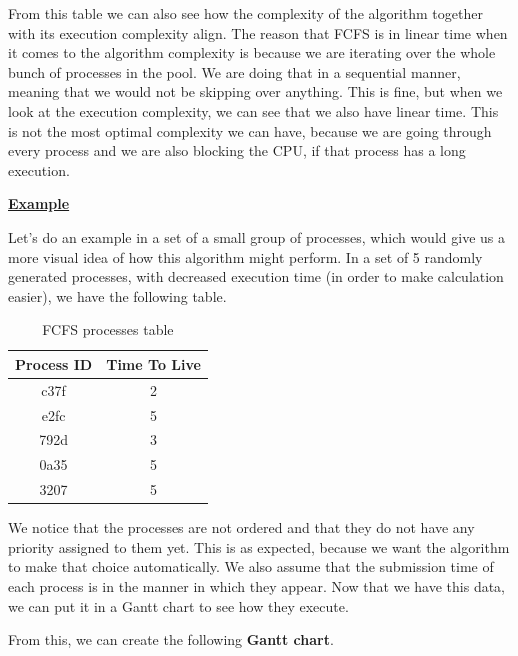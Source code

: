 \documentclass{article}
\begin{document}
From this table we can also see how the complexity of the algorithm together with its execution complexity align. The reason that FCFS is in linear time when it comes to the algorithm complexity is because we are iterating over the whole bunch of processes in the pool. We are doing that in a sequential manner, meaning that we would not be skipping over anything. This is fine, but when we look at the execution complexity, we can see that we also have linear time. This is not the most optimal complexity we can have, because we are going through every process and we are also blocking the CPU, if that process has a long execution.

\bigskip

\underline{\textbf{Example}}

Let's do an example in a set of a small group of processes, which would give us a more visual idea of how this algorithm might perform. In a set of 5 randomly generated processes, with decreased execution time (in order to make calculation easier), we have the following table.

\begin{table}[H]
  \begin{center}
    \label{tab:FCFS processes}
    \begin{tabular}{c|c}
      \toprule
      \textbf{Process ID} & \textbf{Time To Live} \\
      \midrule
      c37f & 2 \\
      e2fc & 5 \\
      792d & 3 \\
      0a35 & 5 \\
      3207 & 5 \\
      \bottomrule
    \end{tabular}
    \caption{FCFS processes table}
  \end{center}
\end{table}

We notice that the processes are not ordered and that they do not have any priority assigned to them yet. This is as expected, because we want the algorithm to make that choice automatically. We also assume that the submission time of each process is in the manner in which they appear. Now that we have this data, we can put it in a Gantt chart to see how they execute.

From this, we can create the following \textbf{Gantt chart}.
\end{document}
